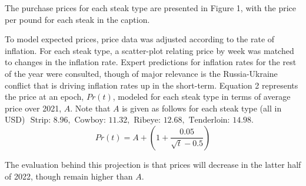 \documentclass[12pt,a4paper]{article}
\begin{document}
The purchase prices for each steak type are presented in Figure 1, with the price per pound for each steak in the caption.

To model expected prices, price data was adjusted according to the rate of inflation. For each steak type, a scatter-plot relating price by week was matched to changes in the inflation rate. Expert predictions for inflation rates for the rest of the year were consulted, though of major relevance is the Russia-Ukraine conflict that is driving inflation rates up in the short-term. Equation 2 represents the price at an epoch, $Pr(t)$, modeled for each steak type in terms of average price over 2021, $A$. 
Note that $A$ is given as follows for each steak type (all in USD) $\text{ Strip: } 8.96, \text{ Cowboy: } 11.32,$ $\text{Ribeye: } 12.68, \text{ Tenderloin: } 14.98.$
\\

\begin{equation} \label{2}
Pr(t) = A + (1 + \frac{0.05}{\sqrt{t} - 0.5}) 
\end{equation}

The evaluation behind this projection is that prices will decrease in the latter half of 2022, though remain higher than $A$. 

\newpage
\end{document}
